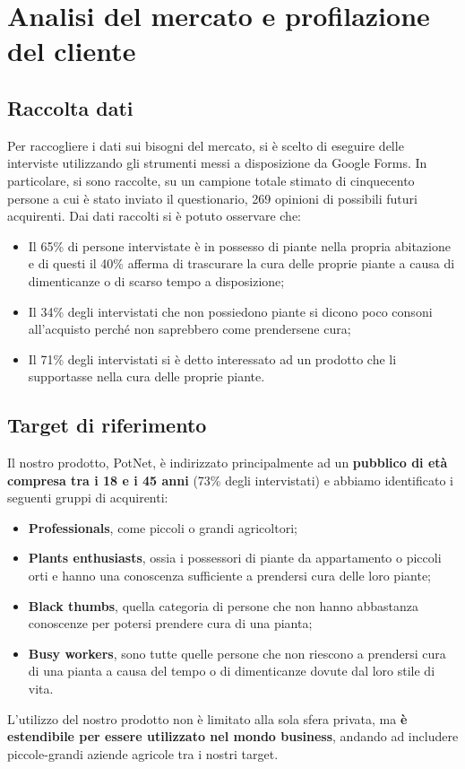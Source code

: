 \newpage
\section{Analisi del mercato e profilazione del cliente}

\subsection{Raccolta dati}

Per raccogliere i dati sui bisogni del mercato, si è scelto di eseguire delle interviste utilizzando gli strumenti messi a disposizione da Google Forms. In particolare, si sono raccolte, su un campione totale stimato di cinquecento persone a cui è stato inviato il questionario, 269 opinioni di possibili futuri acquirenti.
Dai dati raccolti si è potuto osservare che:

\begin{itemize}
	\item Il 65\% di persone intervistate è in possesso di piante nella propria abitazione e di questi il 40\% afferma di trascurare la cura delle proprie piante a causa di dimenticanze o di scarso tempo a disposizione;
	
	\item Il 34\% degli intervistati che non possiedono piante si dicono poco consoni all’acquisto perché non saprebbero come prendersene cura;
	
	\item Il 71\% degli intervistati si è detto interessato ad un prodotto che li supportasse nella cura delle proprie piante.
\end{itemize}

\subsection{Target di riferimento}

Il nostro prodotto, PotNet, è indirizzato principalmente ad un \textbf{pubblico di età compresa tra i 18 e i 45 anni} (73\% degli intervistati) e abbiamo identificato i seguenti gruppi di acquirenti:

\begin{itemize}
	\item \textbf{Professionals}, come piccoli o grandi agricoltori;
	
	\item \textbf{Plants enthusiasts}, ossia i possessori di piante da appartamento o piccoli orti e hanno una conoscenza sufficiente a prendersi cura delle loro piante;	
	
	\item \textbf{Black thumbs}, quella categoria di persone che non hanno abbastanza conoscenze per potersi prendere cura di una pianta;
	
	\item \textbf{Busy workers}, sono tutte quelle persone che non riescono a prendersi cura di una pianta a causa del tempo o di dimenticanze dovute dal loro stile di vita.
\end{itemize}

L’utilizzo del nostro prodotto non è limitato alla sola sfera privata, ma \textbf{è estendibile per essere utilizzato nel mondo business}, andando ad includere piccole-grandi aziende agricole tra i nostri target.